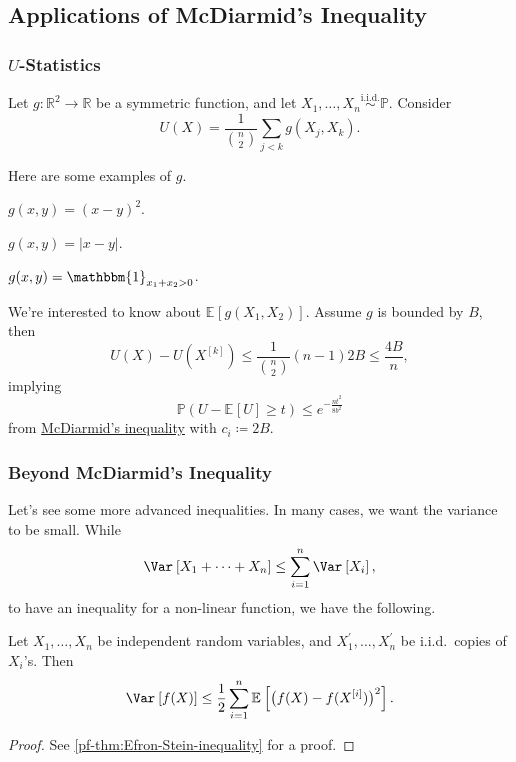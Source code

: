 \subsection{Applications of McDiarmid's Inequality}
\subsubsection{\(U\)-Statistics}

Let \(g\colon \mathbb{R} ^2 \to \mathbb{R} \) be a symmetric function, and let \(X_1, \dots , X_n \overset{\text{i.i.d.} }{\sim } \mathbb{P} \). Consider
\[
	U(X) = \frac{1}{\binom{n}{2}} \sum_{j < k} g(X_j, X_k).
\]

Here are some examples of \(g\).
\begin{eg}
	\(g(x, y) = (x - y)^2\).
\end{eg}

\begin{eg}
	\(g(x, y) = \vert x - y \vert \).
\end{eg}

\begin{eg}
	\(g(x, y) = \mathbbm{1}_{x_1 + x_2 > 0} \).
\end{eg}

We're interested to know about \(\mathbb{E}_{}\left[g(X_1, X_2) \right] \). Assume \(g\) is bounded by \(B\), then
\[
	U(X) - U(X^{[k]}) \leq \frac{1}{\binom{n}{2}} (n-1) 2B \leq \frac{4B}{n},
\]
implying
\[
	\mathbb{P} (U - \mathbb{E}_{}\left[U \right] \geq t) \leq e^{-\frac{nt^2}{8b^2}}
\]
from \hyperref[thm:McDiarmid-inequality]{McDiarmid's inequality} with \(c_i \coloneqq 2B\).

\subsubsection{Beyond McDiarmid's Inequality}
Let's see some more advanced inequalities. In many cases, we want the variance to be small. While
\[
	\Var_{}\left[X_1 + \dots + X_n \right] \leq \sum_{i=1}^{n} \Var_{}\left[X_i \right],
\]
to have an inequality for a non-linear function, we have the following.

\begin{theorem}\label{thm:Efron-Stein-inequality}
	Let \(X_1, \dots , X_n\) be independent random variables, and \(X_1^{\prime} , \dots , X_n^{\prime} \) be i.i.d.\ copies of \(X_i\)'s. Then
	\[
		\Var_{}\left[f(X) \right] \leq \frac{1}{2} \sum_{i=1}^{n} \mathbb{E}_{}\left[\big(f(X) - f(X^{[i]}) \big)^2 \right].
	\]
\end{theorem}
\begin{proof}
	See \autoref{pf-thm:Efron-Stein-inequality} for a proof.
\end{proof}

